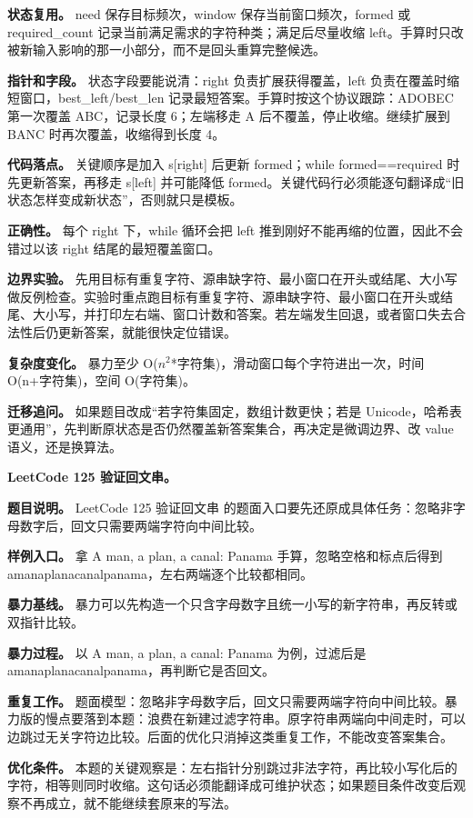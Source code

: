 \textbf{状态复用。} need 保存目标频次，window 保存当前窗口频次，formed 或 required\_count 记录当前满足需求的字符种类；满足后尽量收缩 left。手算时只改被新输入影响的那一小部分，而不是回头重算完整候选。

\textbf{指针和字段。} 状态字段要能说清：right 负责扩展获得覆盖，left 负责在覆盖时缩短窗口，best\_left/best\_len 记录最短答案。手算时按这个协议跟踪：ADOBEC 第一次覆盖 ABC，记录长度 6；左端移走 A 后不覆盖，停止收缩。继续扩展到 BANC 时再次覆盖，收缩得到长度 4。

\textbf{代码落点。} 关键顺序是加入 s[right] 后更新 formed；while formed==required 时先更新答案，再移走 s[left] 并可能降低 formed。关键代码行必须能逐句翻译成“旧状态怎样变成新状态”，否则就只是模板。

\textbf{正确性。} 每个 right 下，while 循环会把 left 推到刚好不能再缩的位置，因此不会错过以该 right 结尾的最短覆盖窗口。

\textbf{边界实验。} 先用目标有重复字符、源串缺字符、最小窗口在开头或结尾、大小写做反例检查。实验时重点跑目标有重复字符、源串缺字符、最小窗口在开头或结尾、大小写，并打印左右端、窗口计数和答案。若左端发生回退，或者窗口失去合法性后仍更新答案，就能很快定位错误。

\textbf{复杂度变化。} 暴力至少 O(\ensuremath{n^{2}}*字符集)，滑动窗口每个字符进出一次，时间 O(n+字符集)，空间 O(字符集)。

\textbf{迁移追问。} 如果题目改成“若字符集固定，数组计数更快；若是 Unicode，哈希表更通用”，先判断原状态是否仍然覆盖新答案集合，再决定是微调边界、改 value 语义，还是换算法。

\noindent\textbf{LeetCode 125 验证回文串。}

\textbf{题目说明。} LeetCode 125 验证回文串 的题面入口要先还原成具体任务：忽略非字母数字后，回文只需要两端字符向中间比较。

\textbf{样例入口。} 拿 A man, a plan, a canal: Panama 手算，忽略空格和标点后得到 amanaplanacanalpanama，左右两端逐个比较都相同。

\textbf{暴力基线。} 暴力可以先构造一个只含字母数字且统一小写的新字符串，再反转或双指针比较。

\textbf{暴力过程。} 以 A man, a plan, a canal: Panama 为例，过滤后是 amanaplanacanalpanama，再判断它是否回文。

\textbf{重复工作。} 题面模型：忽略非字母数字后，回文只需要两端字符向中间比较。暴力版的慢点要落到本题：浪费在新建过滤字符串。原字符串两端向中间走时，可以边跳过无关字符边比较。后面的优化只消掉这类重复工作，不能改变答案集合。

\textbf{优化条件。} 本题的关键观察是：左右指针分别跳过非法字符，再比较小写化后的字符，相等则同时收缩。这句话必须能翻译成可维护状态；如果题目条件改变后观察不再成立，就不能继续套原来的写法。

